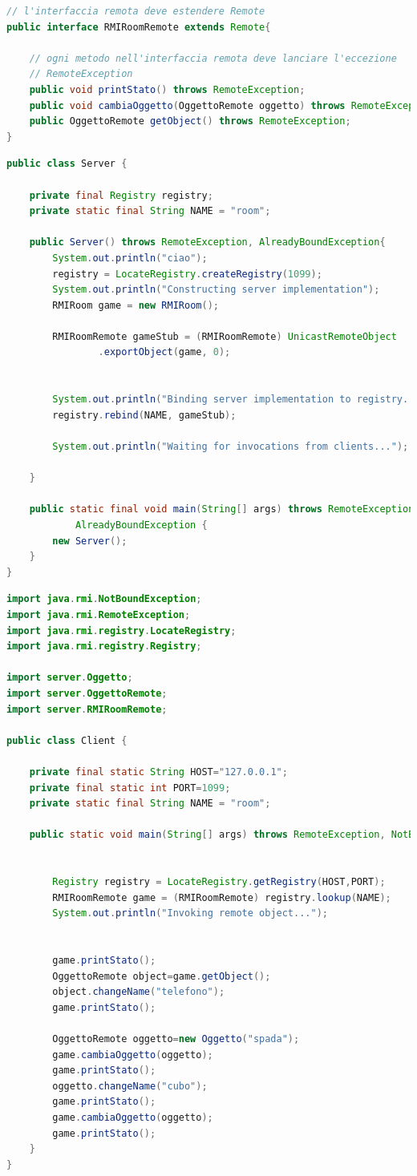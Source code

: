 \documentclass{article}
\begin{document}
\begin{lstlisting}[language=Java,escapechar=|]
// l'interfaccia remota deve estendere Remote
public interface RMIRoomRemote extends Remote{

	// ogni metodo nell'interfaccia remota deve lanciare l'eccezione
	// RemoteException
	public void printStato() throws RemoteException;
	public void cambiaOggetto(OggettoRemote oggetto) throws RemoteException;
	public OggettoRemote getObject() throws RemoteException;
}
\end{lstlisting}

\begin{lstlisting}[language=Java,escapechar=|]
public class Server {

	private final Registry registry;
	private static final String NAME = "room";

	public Server() throws RemoteException, AlreadyBoundException{
		System.out.println("ciao");
		registry = LocateRegistry.createRegistry(1099);
		System.out.println("Constructing server implementation");
		RMIRoom game = new RMIRoom();
		
		RMIRoomRemote gameStub = (RMIRoomRemote) UnicastRemoteObject
				.exportObject(game, 0);
		

		System.out.println("Binding server implementation to registry...");
		registry.rebind(NAME, gameStub);

		System.out.println("Waiting for invocations from clients...");
	
	}

	public static final void main(String[] args) throws RemoteException,
			AlreadyBoundException {
		new Server();
	}
}
\end{lstlisting}

\begin{lstlisting}[language=Java,escapechar=|]
import java.rmi.NotBoundException;
import java.rmi.RemoteException;
import java.rmi.registry.LocateRegistry;
import java.rmi.registry.Registry;

import server.Oggetto;
import server.OggettoRemote;
import server.RMIRoomRemote;

public class Client {

	private final static String HOST="127.0.0.1";
	private final static int PORT=1099;
	private static final String NAME = "room";
	
	public static void main(String[] args) throws RemoteException, NotBoundException {
		
		
		Registry registry = LocateRegistry.getRegistry(HOST,PORT);
		RMIRoomRemote game = (RMIRoomRemote) registry.lookup(NAME);
		System.out.println("Invoking remote object...");
		
		
		game.printStato();
		OggettoRemote object=game.getObject();
		object.changeName("telefono");
		game.printStato();
		
		OggettoRemote oggetto=new Oggetto("spada");
		game.cambiaOggetto(oggetto);
		game.printStato();
		oggetto.changeName("cubo");
		game.printStato();
		game.cambiaOggetto(oggetto);
		game.printStato();
	}
}
\end{lstlisting}
\end{document}
